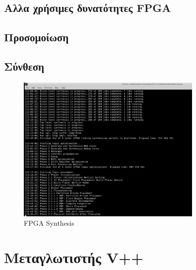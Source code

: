\subsection{Αλλα χρήσιμες δυνατότητες FPGA}
\subsection{Προσομοίωση}
\subsection{Σύνθεση}
\begin{figure}[h!]
  \centering
  \includegraphics[width=0.8\textwidth]{figures/chapter3/synthesis.png}
  \caption{FPGA Synthesis}
  \label{fig:hw_synthesis_fpga}
\end{figure}

\section{Μεταγλωτιστής V++}